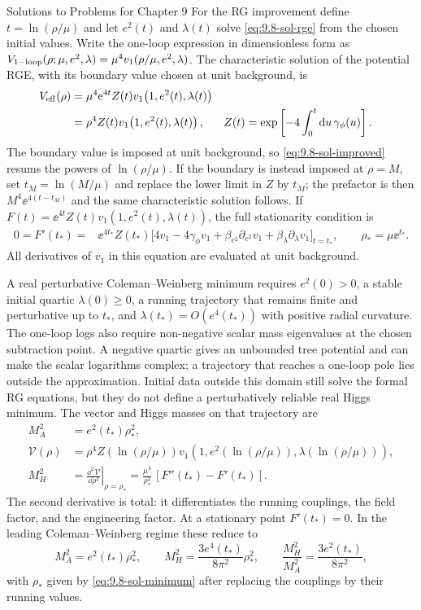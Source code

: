 \begin{bankssolutions}{Solutions to Problems for Chapter 9}
For the RG improvement define $t=\ln(\rho/\mu)$ and let $e^2(t)$ and
$\lambda(t)$ solve \eqref{eq:9.8-sol-rge} from the chosen initial values.
Write the one-loop expression in dimensionless form as
$V_{\rm 1-loop}(\rho;\mu,e^2,\lambda)=\mu^4v_1(\rho/\mu,e^2,\lambda)$.
The characteristic solution of the potential RGE, with its boundary value
chosen at unit background, is
\begin{align}
 V_{\rm eff}(\rho)&=\mu^4\mathrm{e}^{4t}Z(t)
 v_1\!\left(1,e^2(t),\lambda(t)\right)\nonumber\\
 &=\rho^4Z(t)v_1\!\left(1,e^2(t),\lambda(t)\right),
 &Z(t)&=\exp\left[-4\int_0^t\mathop{}\!\mathrm{d} u\,\gamma_\phi(u)\right].
 \label{eq:9.8-sol-improved}
\end{align}
The boundary value is imposed at unit background, so
\eqref{eq:9.8-sol-improved} resums the powers of $\ln(\rho/\mu)$.  If
the boundary is instead imposed at $\rho=M$, set
$t_M=\ln(M/\mu)$ and replace the lower limit in $Z$ by $t_M$; the prefactor
is then $M^4\ee^{4(t-t_M)}$ and the same characteristic solution follows.
If
$F(t)=\ee^{4t}Z(t)v_1(1,e^2(t),\lambda(t))$, the full stationarity
condition is
\begin{align}
 0=F'(t_*)={}&\ee^{4t_*}Z(t_*)\bigl[
 4v_1-4\gamma_\phi v_1
 +\beta_{e^2}\partial_{e^2}v_1
 +\beta_\lambda\partial_\lambda v_1\bigr]_{t=t_*},
 \qquad \rho_*=\mu\ee^{t_*}.
 \label{eq:9.8-sol-improved-stationarity}
\end{align}
All derivatives of $v_1$ in this equation are evaluated at unit background.

A real perturbative Coleman--Weinberg minimum requires
$e^2(0)>0$, a stable initial quartic $\lambda(0)\geq0$, a running
trajectory that remains finite and perturbative up to $t_*$, and
$\lambda(t_*)=O(e^4(t_*))$ with positive radial curvature.  The one-loop
logs also require non-negative scalar mass eigenvalues at the chosen
subtraction point.  A negative quartic gives an unbounded tree potential and
can make the scalar logarithms complex; a trajectory that reaches a one-loop
pole lies outside the approximation.  Initial data outside this domain still
solve the formal RG equations, but they do not define a perturbatively
reliable real Higgs minimum.
The vector and Higgs masses on that trajectory are
\begin{align*}
 M_A^2&=e^2(t_*)\rho_*^2,\\
 \mathcal V(\rho)&=\rho^4Z(\ln(\rho/\mu))
 v_1\!\left(1,e^2(\ln(\rho/\mu)),
                 \lambda(\ln(\rho/\mu))\right),\\
 M_H^2&=\left.\frac{\dd^2\mathcal V}{\dd\rho^2}\right|_{\rho=\rho_*}
 =\frac{\mu^4}{\rho_*^2}\,[F''(t_*)-F'(t_*)].
\end{align*}
The second derivative is total: it differentiates the running couplings, the
field factor, and the engineering factor.  At a stationary point
$F'(t_*)=0$.
In the leading Coleman--Weinberg regime these reduce to
\[
 M_A^2=e^2(t_*)\rho_*^2,
 \qquad M_H^2=\frac{3e^4(t_*)}{8\pi^2}\rho_*^2,
 \qquad \frac{M_H^2}{M_A^2}=\frac{3e^2(t_*)}{8\pi^2},
\]
with $\rho_*$ given by \eqref{eq:9.8-sol-minimum} after replacing the
couplings by their running values.


\end{bankssolutions}
